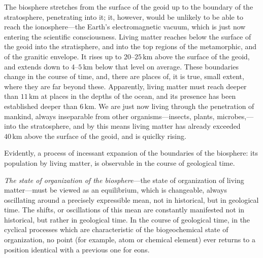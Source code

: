 The biosphere stretches from the surface of the geoid up to the boundary of the
stratosphere, penetrating into it; it, however, would be unlikely to be able to
reach the ionosphere---the Earth's electromagnetic vacuum, which is just now
entering the scientific consciousness.  Living matter reaches below the surface
of the geoid into the stratisphere, and into the top regions of the
metamorphic, and of the granitic envelope.  It rises up to
20--$25\,\mathrm{km}$ above the surface of the geoid, and extends down to
4--$5\,\mathrm{km}$ below that level on average.  These boundaries change in
the course of time, and, there are places of, it is true, small extent, where
they are far beyond these.  Apparently, living matter must reach deeper than
$11\,\mathrm{km}$ at places in the depths of the ocean, and its presence has
been established deeper than $6\,\mathrm{km}$.  We are just now living through the penetration of mankind, always
inseparable from other organisms---insects, plants, microbes,---into the
stratosphere, and by this means living matter has already exceeded
$40\,\mathrm{km}$ above the surface of the geoid, and is quiclky rising.

Evidently, a process of incessant expansion of the boundaries of the biosphere:
its population by living matter, is observable in the course of geological
time.


\Section %
\emph{The state of organization of the biosphere}---the state of organization
of living matter---must be viewed as an equilibrium, which is changeable,
always oscillating around a precisely expressible mean, not in historical, but
in geological time.  The shifts, or oscillations of this mean are constantly
manifested not in historical, but rather in geological time.  In the course of
geological time, in the cyclical processes which are characteristic of the
biogeochemical state of organization, no point (for example, atom or chemical
element) ever returns to a position identical with a previous one for eons.

